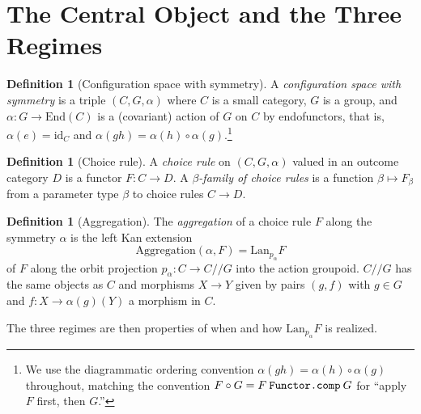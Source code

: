 \documentclass[11pt,a4paper]{article}
\theoremstyle{plain}
\theoremstyle{definition}
\newtheorem{definition}[theorem]{Definition}
\theoremstyle{remark}
\newcommand{\Lan}{\mathrm{Lan}}
\newcommand{\id}{\mathrm{id}}
\newcommand{\fpath}[1]{\texttt{\detokenize{#1}}}
\newcommand{\sslash}{\mathbin{/\!\!/}}
\begin{document}
\section{The Central Object and the Three Regimes}
\label{sec:object}

\begin{definition}[Configuration space with symmetry]
A \emph{configuration space with symmetry} is a triple $(C, G, \alpha)$
where $C$ is a small category, $G$ is a group, and $\alpha : G \to
\mathrm{End}(C)$ is a (covariant) action of $G$ on $C$ by endofunctors,
that is, $\alpha(e) = \id_C$ and $\alpha(gh) = \alpha(h) \circ
\alpha(g)$.\footnote{We use the diagrammatic ordering convention
$\alpha(gh) = \alpha(h) \circ \alpha(g)$ throughout, matching the
\fpath{comp-cat-theory} convention
$F \circ G = F \mathbin{\fpath{Functor.comp}} G$
for ``apply $F$ first, then $G$.''}
\end{definition}

\begin{definition}[Choice rule]
A \emph{choice rule} on $(C, G, \alpha)$ valued in an outcome category
$D$ is a functor $F : C \to D$.  A \emph{$\beta$-family of choice
rules} is a function $\beta \mapsto F_\beta$ from a parameter type
$\beta$ to choice rules $C \to D$.
\end{definition}

\begin{definition}[Aggregation]
The \emph{aggregation} of a choice rule $F$ along the symmetry
$\alpha$ is the left Kan extension
\[
  \mathrm{Aggregation}(\alpha, F) = \Lan_{p_\alpha} F
\]
of $F$ along the orbit projection $p_\alpha : C \to C \sslash G$ into
the action groupoid.  $C \sslash G$ has the same objects as $C$ and
morphisms $X \to Y$ given by pairs $(g, f)$ with $g \in G$ and
$f : X \to \alpha(g)(Y)$ a morphism in $C$.
\end{definition}

The three regimes are then properties of when and how
$\Lan_{p_\alpha} F$ is realized.
\end{document}
